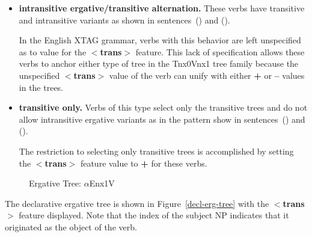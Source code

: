 \begin{itemize}
\item {\bf intransitive ergative/transitive alternation.}  These verbs
have transitive and intransitive variants as shown in sentences~() and
().



In the English XTAG grammar, verbs with this behavior are left unspecified as
to value for the {\bf$<$trans$>$} feature.  This lack of specification allows
these verbs to anchor either type of tree in the Tnx0Vnx1 tree family because
the unspecified {\bf$<$trans$>$} value of the verb can unify with either {\bf
+} or {\bf --} values in the trees.

\item {\bf transitive only.}  Verbs of this type select only the
transitive trees and do not allow intransitive ergative variants as in
the pattern show in sentences~() and ().


The restriction to selecting only transitive trees is accomplished by
setting the {\bf$<$trans$>$} feature value to {\bf +} for these verbs.
\end{itemize}

\begin{figure}[htb]
\centering
\mbox{}
\caption{Ergative Tree: $\alpha$Enx1V}
\label{decl-erg-tree}
\label{2;14,1}
\end{figure}

The declarative ergative tree is shown in Figure~\ref{decl-erg-tree} with the
{\bf $<$trans$>$} feature displayed.  Note that the index of the subject NP
indicates that it originated as the object of the verb.























